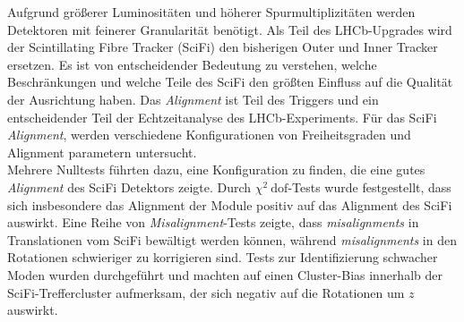 Aufgrund größerer Luminositäten und höherer Spurmultiplizitäten werden Detektoren mit feinerer Granularität benötigt.
Als Teil des LHCb-Upgrades wird der Scintillating Fibre Tracker (SciFi) den bisherigen Outer und Inner Tracker ersetzen. Es ist von entscheidender Bedeutung zu verstehen, welche Beschränkungen und welche Teile des SciFi den größten Einfluss auf die Qualität der Ausrichtung haben.
Das \textit{Alignment} ist Teil des Triggers und ein entscheidender Teil der Echtzeitanalyse des LHCb-Experiments.
Für das SciFi \textit{Alignment}, werden verschiedene Konfigurationen von Freiheitsgraden und Alignment parametern untersucht.
\\
Mehrere Nulltests führten dazu, eine Konfiguration zu finden, die eine gutes \textit{Alignment} des SciFi Detektors zeigte.
Durch $\chi^2 \ \text{dof}$-Tests wurde festgestellt, dass sich insbesondere das Alignment der Module positiv auf das Alignment des SciFi auswirkt.
Eine Reihe von \textit{Misalignment}-Tests zeigte, dass \textit{misalignments} in Translationen vom SciFi bewältigt werden können, während \textit{misalignments} in den Rotationen schwieriger zu korrigieren sind.
Tests zur Identifizierung schwacher Moden wurden durchgeführt und machten auf einen Cluster-Bias innerhalb der SciFi-Treffercluster aufmerksam, der sich negativ auf die Rotationen um $z$ auswirkt.

